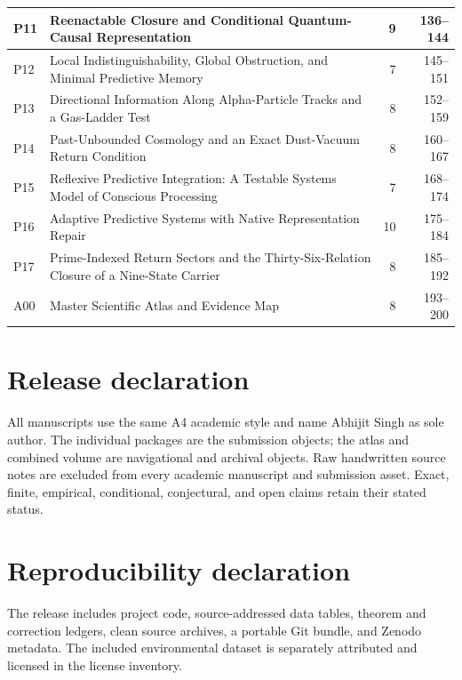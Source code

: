 \documentclass[11pt,a4paper]{article}
\begin{document}
\begin{longtable}{@{}p{}p{}r r@{}}
P11 & Reenactable Closure and Conditional Quantum-Causal Representation & 9 & 136--144 \\ \midrule
P12 & Local Indistinguishability, Global Obstruction, and Minimal Predictive Memory & 7 & 145--151 \\ \midrule
P13 & Directional Information Along Alpha-Particle Tracks and a Gas-Ladder Test & 8 & 152--159 \\ \midrule
P14 & Past-Unbounded Cosmology and an Exact Dust-Vacuum Return Condition & 8 & 160--167 \\ \midrule
P15 & Reflexive Predictive Integration: A Testable Systems Model of Conscious Processing & 7 & 168--174 \\ \midrule
P16 & Adaptive Predictive Systems with Native Representation Repair & 10 & 175--184 \\ \midrule
P17 & Prime-Indexed Return Sectors and the Thirty-Six-Relation Closure of a Nine-State Carrier & 8 & 185--192 \\ \midrule
A00 & Master Scientific Atlas and Evidence Map & 8 & 193--200 \\ \midrule
\bottomrule
\end{longtable}
\clearpage
\section*{Release declaration}
All manuscripts use the same A4 academic style and name Abhijit Singh as sole author. The individual packages are the submission objects; the atlas and combined volume are navigational and archival objects. Raw handwritten source notes are excluded from every academic manuscript and submission asset. Exact, finite, empirical, conditional, conjectural, and open claims retain their stated status.
\section*{Reproducibility declaration}
The release includes project code, source-addressed data tables, theorem and correction ledgers, clean source archives, a portable Git bundle, and Zenodo metadata. The included environmental dataset is separately attributed and licensed in the license inventory.
\end{document}
